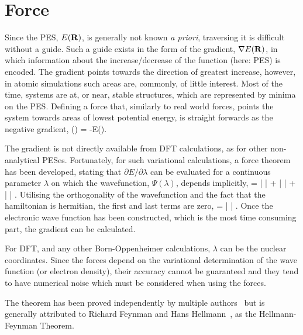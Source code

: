 \section{Force}
\label{sec:force}
Since the PES, $E({\mathrm{\mathbf{\bm{R}}}})$, is generally not known \textit{a priori}, traversing it is difficult without a guide.
Such a guide exists in the form of the gradient, $\nabla E({\mathrm{\mathbf{\bm{R}}}})$, in which information about the increase/decrease of the function (here: PES) is encoded.
The gradient points towards the direction of greatest increase, however, in atomic simulations such areas are, commonly, of little interest.
Most of the time, systems are at, or near, stable structures, which are represented by minima on the PES.
Defining a force that, similarly to real world forces, points the system towards areas of lowest potential energy, is straight forwards as the negative gradient,
\vF(\vR) = -\nabla E(\vR).
\eeq

The gradient is not directly available from DFT calculations, as for other non-analytical PESes.
Fortunately, for such variational calculations, a force theorem has been developed, stating that $\partial E / \partial\lambda$ can be evaluated for a continuous parameter $\lambda$ on which the wavefunction, $\Psi(\lambda)$, depends implicitly,
 = 
\bra \frac{\partial \Psi}{\partial \lambda} |  | \Psi \ket +
\bra \Psi |  | \Psi \ket +
\bra \Psi |  | \frac{\partial \Psi}{\partial \lambda} \ket.
\eeq
Utilising the orthogonality of the wavefunction and the fact that the hamiltonian is hermitian, the first and last terms are zero, 
 = \bra \Psi |  | \Psi \ket.
\eeq
Once the electronic wave function has been constructed, which is the most time consuming part, the gradient can be calculated.

For DFT, and any other Born-Oppenheimer calculations, $\lambda$ can be the nuclear coordinates.
Since the forces depend on the variational determination of the wave function (or electron density), their accuracy cannot be guaranteed and they tend to have numerical noise\cite{gpaw-2005} which must be considered when using the forces.

The theorem has been proved independently by multiple authors~\cite{forces-pauli-1933, forces-guttinger-1932} but is generally attributed to Richard Feynman\cite{forces-feynman-1939} and Hans Hellmann~\cite{forces-hellmann-1937}, as the Hellmann-Feynman Theorem.
